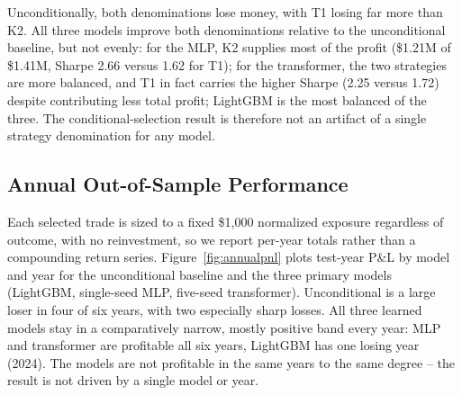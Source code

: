 \documentclass[sigconf,review]{acmart}
\begin{document}
\begin{table}[t]
\centering
\footnotesize
{}
\caption{Table~\ref{tab:consolidated}'s primary result per model (single seed for LightGBM/MLP, five-seed ensemble for the transformer), split by T1/K2 so the source of improvement can be checked rather than assumed. Same \$1{,}000-per-trade convention and $p\ge0.5$ rule as Table~\ref{tab:consolidated}; `Combined' reproduces that row's Total P\&L.}
\label{tab:t1k2}
\end{table}

Unconditionally, both denominations lose money, with T1 losing far more than K2. All three models improve both denominations relative to the unconditional baseline, but not evenly: for the MLP, K2 supplies most of the profit (\$1.21M of \$1.41M, Sharpe 2.66 versus 1.62 for T1); for the transformer, the two strategies are more balanced, and T1 in fact carries the higher Sharpe (2.25 versus 1.72) despite contributing less total profit; LightGBM is the most balanced of the three. The conditional-selection result is therefore not an artifact of a single strategy denomination for any model.

\subsection{Annual Out-of-Sample Performance}
Each selected trade is sized to a fixed \$1{,}000 normalized exposure regardless of outcome, with no reinvestment, so we report per-year totals rather than a compounding return series. Figure~\ref{fig:annualpnl} plots test-year P\&L by model and year for the unconditional baseline and the three primary models (LightGBM, single-seed MLP, five-seed transformer). Unconditional is a large loser in four of six years, with two especially sharp losses. All three learned models stay in a comparatively narrow, mostly positive band every year: MLP and transformer are profitable all six years, LightGBM has one losing year (2024). The models are not profitable in the same years to the same degree -- the result is not driven by a single model or year.
\end{document}
